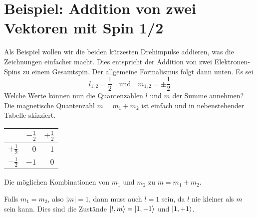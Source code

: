 \section{Beispiel: Addition von zwei Vektoren mit Spin 1/2 }

Als Beispiel wollen wir die beiden kürzesten Drehimpulse addieren, was die Zeichnungen einfacher macht. Dies entspricht der Addition von zwei Elektronen-Spins zu einem Gesamtspin. Der allgemeine Formalismus folgt dann unten.
Es sei
\begin{equation}
l_{1,2} = \frac{1}{2} \quad \text{und} \quad m_{1,2} = \pm \frac{1}{2} 
\end{equation}
Welche Werte können nun die Quantenzahlen  $l$ und $m$ der Summe annehmen? Die magnetische Quantenzahl $m  = m_1 + m_2$ ist einfach und in nebenstehender Tabelle skizziert.
%
\begin{marginfigure}
\begin{tabular}{r|rr}
                           & $-\frac{1}{2} $  & $+\frac{1}{2} $ \\
                           \hline
 $+\frac{1}{2} $    &     $0$              & $1$ \\
 $-\frac{1}{2} $    &     $-1$              & $0$ 
\end{tabular}
\caption{Die möglichen Kombinationen von $m_1$ und $m_2$ zu $m = m_1 + m_2$.}
\end{marginfigure}
%
Falls $m_1 = m_2$, also $|m| = 1$, dann muss auch $l = 1$ sein, da $l$ nie kleiner als $m$ sein kann. Dies sind die Zustände $\ket{l, m} = \ket{1, -1} $ und $\ket{1, +1} $.


